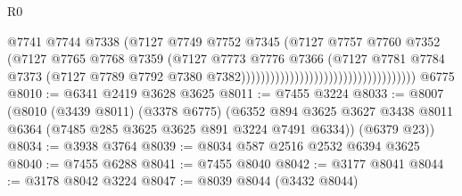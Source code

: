 \begin{lexlean}{R0}
\begin{coremodule}
                                                                @7741
                                                                @7744
                                                                @7338
                                                                (@7127
                                                                  @7749
                                                                  @7752
                                                                  @7345
                                                                  (@7127
                                                                    @7757
                                                                    @7760
                                                                    @7352
                                                                    (@7127
                                                                      @7765
                                                                      @7768
                                                                      @7359
                                                                      (@7127
                                                                        @7773
                                                                        @7776
                                                                        @7366
                                                                        (@7127
                                                                          @7781
                                                                          @7784
                                                                          @7373
                                                                          (@7127
                                                                            @7789
                                                                            @7792
                                                                            @7380
                                                                            @7382))))))))))))))))))))))))))))))))))))
    @6775
@8010 := @6341 @2419 @3628 @3625
@8011 := @7455 @3224
@8033 := @8007
    (@8010
      (@3439 @8011)
      (@3378 @6775)
      (@6352 @894 @3625 @3627 @3438 @8011 @6364 (@7485 @285 @3625 @3625 @891 @3224 @7491 @6334))
      (@6379 @23))
@8034 := @3938 @3764
@8039 := @8034 @587 @2516 @2532 @6394 @3625
@8040 := @7455 @6288
@8041 := @7455 @8040
@8042 := @3177 @8041
@8044 := @3178 @8042 @3224
@8047 := @8039 @8044 (@3432 @8044)

\end{coremodule}
\end{lexlean}

